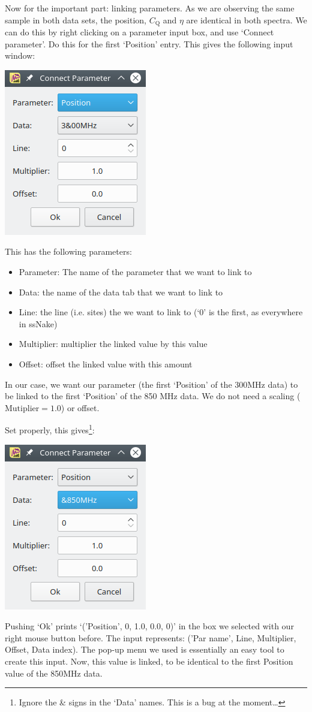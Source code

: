 \documentclass[11pt,a4paper]{article}
\begin{document}
Now for the important part: linking parameters. As we are observing the same sample in both data sets,
the position, $C_\text{Q}$ and $\eta$ are identical in both spectra. We can do this by right
clicking on a parameter input box, and use `Connect parameter'. Do this for the first `Position'
entry. This gives the following input
window:
\begin{center}
\includegraphics[width=0.3\linewidth]{Figs/Fig9.png}
\end{center}
This has the following parameters:
\begin{itemize}
  \item Parameter: The name of the parameter that we want to link to
  \item Data: the name of the data tab that we want to link to
  \item Line: the line (i.e. sites) the we want to link to (`0' is the first, as everywhere in
	 ssNake)
  \item Multiplier: multiplier the linked value by this value
  \item Offset: offset the linked value with this amount
\end{itemize}
 In our case, we want our parameter (the first `Position' of the 300MHz data) to be linked to the
 first `Position' of the 850 MHz data. We do not need a scaling ($\text{Mutiplier}=1.0$) or offset.

 Set properly, this gives\footnote{Ignore the \& signs in the `Data' names. This is a bug at the
 moment\ldots}:
\begin{center}
\includegraphics[width=0.3\linewidth]{Figs/Fig10.png}
\end{center}
Pushing `Ok' prints `('Position', 0, 1.0, 0.0, 0)' in the box we selected with our right mouse button
before. The input represents: ('Par name', Line, Multiplier, Offset, Data index). The pop-up menu we
used is essentially an easy tool to create this input. Now, this value is linked, to be identical to
the first Position value of the 850MHz data.
\end{document}
